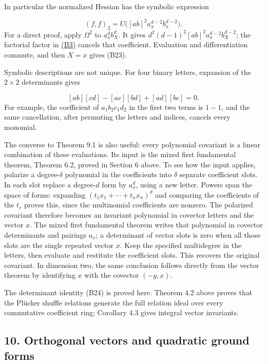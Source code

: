 \documentclass[
]{article}
\begin{document}
In particular the normalized Hessian has the symbolic expression
\protect{}\label{equation-B23}{}

\[
(f,f)_2=U\bigl([ab]^2a_x^{d-2}b_x^{d-2}\bigr).
\tag{B23}
\] For a direct proof, apply \(\Omega^2\) to \(a_x^db_X^d\). It gives
\(d^2(d-1)^2 [ab]^2a_x^{d-2}b_X^{d-2}\); the factorial factor in
\href{NOE-INV-01.html\#equation-B3}{(B3)} cancels that coefficient.
Evaluation and differentiation commute, and then \(X=x\) gives (B23).

Symbolic descriptions are not unique. For four binary letters, expansion
of the \(2\times2\) determinants gives
\protect{}\label{equation-B24}{}

\[
[ab][cd]-[ac][bd]+[ad][bc]=0.
\tag{B24}
\] For example, the coefficient of \(a_1b_2c_1d_2\) in the first two
terms is \(1-1\), and the same cancellation, after permuting the letters
and indices, cancels every monomial.

The converse to Theorem 9.1 is also useful: every polynomial covariant
is a linear combination of these evaluations. Its input is the mixed
first fundamental theorem, Theorem 6.2, proved in Section 6 above. To
see how the input applies, polarize a degree-\(\delta\) polynomial in
the coefficients into \(\delta\) separate coefficient slots. In each
slot replace a degree-\(d\) form by \(a_x^d\), using a new letter.
Powers span the space of forms: expanding \((t_1x_1+\cdots+t_nx_n)^d\)
and comparing the coefficients of the \(t_r\) proves this, since the
multinomial coefficients are nonzero. The polarized covariant therefore
becomes an invariant polynomial in covector letters and the vector
\(x\). The mixed first fundamental theorem writes that polynomial in
covector determinants and pairings \(a_x\); a determinant of vector
slots is zero when all those slots are the single repeated vector \(x\).
Keep the specified multidegree in the letters, then evaluate and
restitute the coefficient slots. This recovers the original covariant.
In dimension two, the same conclusion follows directly from the vector
theorem by identifying \(x\) with the covector \((-y,x)\).

The determinant identity (B24) is proved here. Theorem 4.2 above proves
that the Plücker shuffle relations generate the full relation ideal over
every commutative coefficient ring; Corollary 4.3 gives integral vector
invariants.

\subsection{10. Orthogonal vectors and quadratic ground
forms}\label{section-10}
\end{document}
